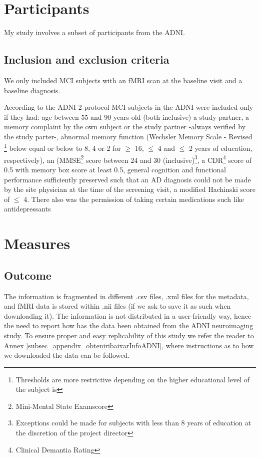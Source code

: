 \section{Participants} %
	My study involves a subset of participants from the ADNI.
	
	
	
	
	\subsection{Inclusion and exclusion criteria}
 
	We only included MCI subjects with an fMRI scan at the baseline visit and a baseline diagnosis. 
	
	According to the ADNI 2 protocol MCI subjects in the ADNI were included only if they had: age between 55 and 90 years old (both inclusive) a study partner, a memory complaint by the own subject or the study partner -always verified by the study parter-, abnormal memory function (Wechsler Memory Scale - Revised \footnote{Thresholds are more restrictive depending on the higher educational level of the subject is} below equal or below to 8, 4 or 2 for $\geq$ 16, $\leq$ 4 and $\leq$ 2 years of education, respectively), an (MMSE\footnote{Mini-Mental State Examscore} score between 24 and 30 (inclusive)\footnote{Exceptions
	could be made for subjects with less than 8 years of education at the
	discretion of the project director}, a CDR\footnote{Clinical Demantia Rating} score of 0.5 with memory box score at least 0.5, general cognition and functional performance sufficiently preserved such that an AD diagnosis could not be made by the site physician at the time of the screening visit, a modified Hachinski score of $\leq$ 4. There also was the permission of taking certain medications such like antidepressants

	
	
	
	
\section{Measures}%

	\subsection{Outcome} %

	 
		The information is fragmented in different .csv files, .xml files for the metadata, and fMRI data is stored within .nii files (if we ask to save it as such when downloading it). The information is not distributed in a user-friendly way, hence the need to report how has the data been obtained from the ADNI neuroimaging study. To ensure proper and easy replicability of this study we refer the reader to Annex \ref{subsec_appendix_obteniribaixarInfoADNI}, where instructions as to how we downloaded the data can be followed.
			


